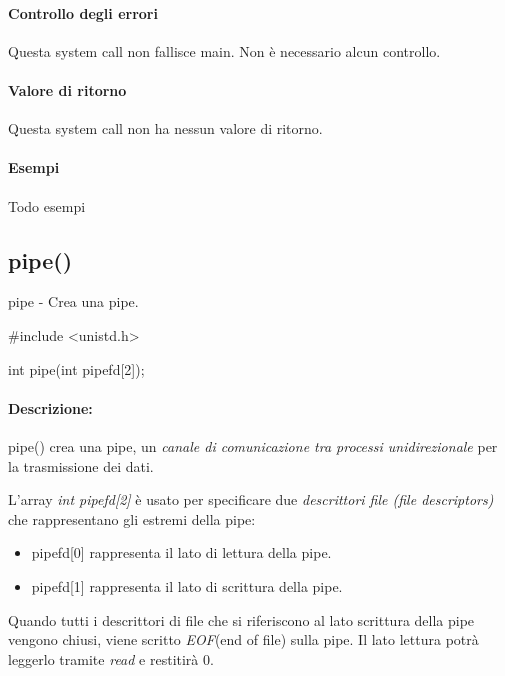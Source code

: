 \documentclass
[10pt,        %
 a4paper,     %
 onecolumn,   %
 fleqn,       %
 oneside,     %
 notitlepage, %
]{article}    %
\begin{document}
\paragraph{Controllo degli errori}
Questa system call non fallisce main. Non è necessario alcun controllo.

\paragraph{Valore di ritorno}
Questa system call non ha nessun valore di ritorno.

\paragraph{Esempi}
Todo esempi





\subsection{pipe()}
pipe - Crea una pipe.
\begin{C}[name=pipe()]
#include <unistd.h>

int pipe(int pipefd[2]);
\end{C}

\paragraph{Descrizione:}
pipe() crea una pipe, un \textit{canale di comunicazione tra processi unidirezionale} per la trasmissione dei dati. 

L'array \textit{int pipefd[2]} è usato per specificare due \textit{descrittori file (file descriptors)} che rappresentano gli estremi della pipe:
\begin{itemize}
    \item pipefd[0] rappresenta il lato di lettura della pipe.
    \item pipefd[1] rappresenta il lato di scrittura della pipe.
\end{itemize}

Quando tutti i descrittori di file che si riferiscono al lato scrittura della pipe vengono chiusi, viene scritto \textit{EOF}(end of file) sulla pipe. Il lato lettura potrà leggerlo tramite \textit{read} e restitirà 0.
\end{document}
